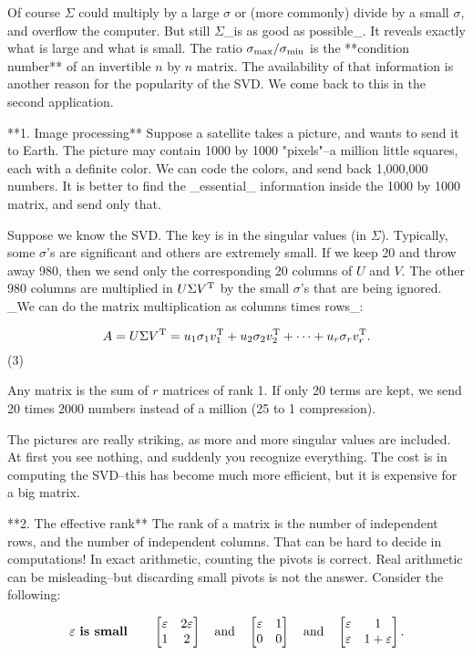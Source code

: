 Of course \(\Sigma\) could multiply by a large \(\sigma\) or (more commonly) divide by a small \(\sigma\), and overflow the computer. But still \(\Sigma\)_is as good as possible_. It reveals exactly what is large and what is small. The ratio \(\sigma_{\rm max}/\sigma_{\rm min}\) is the **condition number** of an invertible \(n\) by \(n\) matrix. The availability of that information is another reason for the popularity of the SVD. We come back to this in the second application.

**1. Image processing** Suppose a satellite takes a picture, and wants to send it to Earth. The picture may contain 1000 by 1000 "pixels"--a million little squares, each with a definite color. We can code the colors, and send back 1,000,000 numbers. It is better to find the _essential_ information inside the 1000 by 1000 matrix, and send only that.

Suppose we know the SVD. The key is in the singular values (in \(\Sigma\)). Typically, some \(\sigma\)'s are significant and others are extremely small. If we keep 20 and throw away 980, then we send only the corresponding 20 columns of \(U\) and \(V\). The other 980 columns are multiplied in \(U\Sigma V^{\rm T}\) by the small \(\sigma\)'s that are being ignored. _We can do the matrix multiplication as columns times rows_:

\[A=U\Sigma V^{\rm T}=u_{1}\sigma_{1}v_{1}^{\rm T}+u_{2}\sigma_{2}v_{2}^{\rm T}+ \cdots+u_{r}\sigma_{r}v_{r}^{\rm T}.\] (3)

Any matrix is the sum of \(r\) matrices of rank 1. If only 20 terms are kept, we send 20 times 2000 numbers instead of a million (25 to 1 compression).

The pictures are really striking, as more and more singular values are included. At first you see nothing, and suddenly you recognize everything. The cost is in computing the SVD--this has become much more efficient, but it is expensive for a big matrix.

**2. The effective rank** The rank of a matrix is the number of independent rows, and the number of independent columns. That can be hard to decide in computations! In exact arithmetic, counting the pivots is correct. Real arithmetic can be misleading--but discarding small pivots is not the answer. Consider the following:

\[\varepsilon\ \mbox{\bf is small}\qquad\begin{bmatrix}\varepsilon&2\varepsilon \\ 1&2\end{bmatrix}\quad\mbox{and}\quad\begin{bmatrix}\varepsilon&1\\ 0&0\end{bmatrix}\quad\mbox{and}\quad\begin{bmatrix}\varepsilon&1\\ \varepsilon&1+\varepsilon\end{bmatrix}.\]

